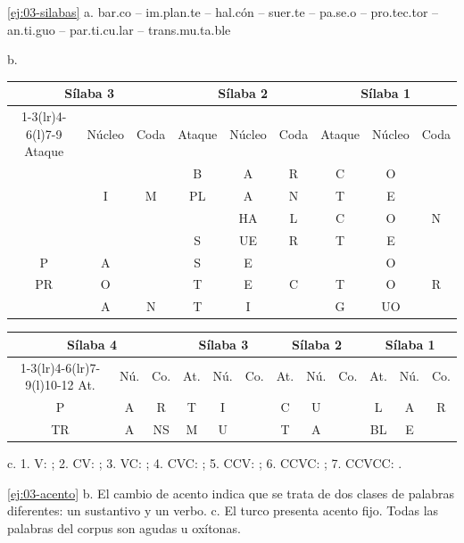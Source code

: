 \begin{solucion}{\ref{ej:03-silabas}}
a. bar.co -- im.plan.te -- hal.cón -- suer.te -- pa.se.o -- pro.tec.tor --
an.ti.guo -- par.ti.cu.lar -- trans.mu.ta.ble

b.

{\footnotesize
\begin{tabular}{@{}*{9}{c}@{}}
  \toprule
  \multicolumn{3}{c}{Sílaba 3} & \multicolumn{3}{c}{Sílaba 2} & \multicolumn{3}{c}{Sílaba 1} \\
  \cmidrule(r){1-3}\cmidrule(lr){4-6}\cmidrule(l){7-9}
  Ataque & Núcleo & Coda & Ataque & Núcleo & Coda & Ataque & Núcleo & Coda \\
  \midrule
     &    &    & B  & A  & R & C & O  &   \\
     & I  & M  & PL & A  & N & T & E  &   \\
     &    &    &    & HA & L & C & O  & N \\
     &    &    & S  & UE & R & T & E  &   \\
  P  & A  &    & S  & E  &   &   & O  &   \\
  PR & O  &    & T  & E  & C & T & O  & R \\
     & A  & N  & T  & I  &   & G & UO &   \\
  \bottomrule
\end{tabular}

\medskip
\begin{tabular}{@{}*{12}{c}@{}}
  \toprule
  \multicolumn{3}{c}{Sílaba 4} & \multicolumn{3}{c}{Sílaba 3} & \multicolumn{3}{c}{Sílaba 2} & \multicolumn{3}{c}{Sílaba 1} \\
  \cmidrule(r){1-3}\cmidrule(lr){4-6}\cmidrule(lr){7-9}\cmidrule(l){10-12}
  At. & Nú. & Co. & At. & Nú. & Co. & At. & Nú. & Co. & At. & Nú. & Co. \\
  \midrule
  P  & A & R  & T & I &  & C & U &  & L  & A & R \\
  TR & A & NS & M & U &  & T & A &  & BL & E &   \\
  \bottomrule
\end{tabular}}

c. 1. V: ; 2. CV: ; 3. VC:
; 4. CVC: ; 5. CCV:
; 6. CCVC: ; 7. CCVCC:
.
\end{solucion}

\begin{solucion}{\ref{ej:03-acento}}
b. El cambio de acento indica que se trata de dos clases de palabras diferentes:
un sustantivo y un verbo. c. El turco presenta acento fijo. Todas las palabras
del corpus son agudas u oxítonas.
\end{solucion}

